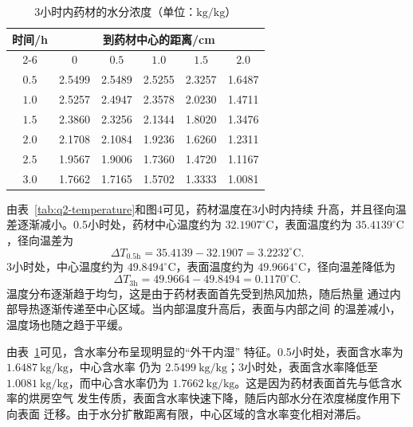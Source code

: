 \documentclass[12pt,a4paper]{article}
\begin{document}
\begin{table}[H]
\centering
\caption{3小时内药材的水分浓度（单位：$\mathrm{kg/kg}$）}
\label{tab:q2-moisture}
\begin{tabular}{cccccc}
\toprule
\multirow{2}{*}{时间/h}
& \multicolumn{5}{c}{到药材中心的距离/cm}\\
\cmidrule(lr){2-6}
& $0$ & $0.5$ & $1.0$ & $1.5$ & $2.0$\\
\midrule
$0.5$ & 2.5499 & 2.5489 & 2.5255 & 2.3257 & 1.6487\\
$1.0$ & 2.5257 & 2.4947 & 2.3578 & 2.0230 & 1.4711\\
$1.5$ & 2.3860 & 2.3256 & 2.1344 & 1.8020 & 1.3476\\
$2.0$ & 2.1708 & 2.1084 & 1.9236 & 1.6260 & 1.2311\\
$2.5$ & 1.9567 & 1.9006 & 1.7360 & 1.4720 & 1.1167\\
$3.0$ & 1.7662 & 1.7165 & 1.5702 & 1.3333 & 1.0081\\
\bottomrule
\end{tabular}
\end{table}






由表~\ref{tab:q2-temperature}和图4可见，药材温度在3小时内持续
升高，并且径向温差逐渐减小。0.5小时处，药材中心温度约为
$32.1907^\circ\mathrm{C}$，表面温度约为
$35.4139^\circ\mathrm{C}$，径向温差为
\begin{equation}
\Delta T_{0.5\mathrm h}
=
35.4139-32.1907
=
3.2232^\circ\mathrm{C}.
\end{equation}
3小时处，中心温度约为 $49.8494^\circ\mathrm{C}$，表面温度约为
$49.9664^\circ\mathrm{C}$，径向温差降低为
\begin{equation}
\Delta T_{3\mathrm h}
=
49.9664-49.8494
=
0.1170^\circ\mathrm{C}.
\end{equation}
温度分布逐渐趋于均匀，这是由于药材表面首先受到热风加热，随后热量
通过内部导热逐渐传递至中心区域。当内部温度升高后，表面与内部之间
的温差减小，温度场也随之趋于平缓。

由表~\ref{tab:q2-moisture}可见，含水率分布呈现明显的“外干内湿”
特征。0.5小时处，表面含水率为 $1.6487\ \mathrm{kg/kg}$，中心含水率
仍为 $2.5499\ \mathrm{kg/kg}$；3小时处，表面含水率降低至
$1.0081\ \mathrm{kg/kg}$，而中心含水率仍为
$1.7662\ \mathrm{kg/kg}$。这是因为药材表面首先与低含水率的烘房空气
发生传质，表面含水率快速下降，随后内部水分在浓度梯度作用下向表面
迁移。由于水分扩散距离有限，中心区域的含水率变化相对滞后。
\end{document}
